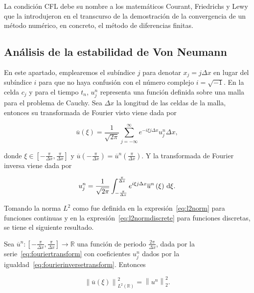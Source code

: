La condición CFL debe su nombre a los matemáticos Courant, Friedrichs
y Lewy que la introdujeron en el transcurso de la demostración de la
convergencia de un método numérico, en concreto, el método de
diferencias finitas.

\subsection{Análisis de la estabilidad de Von Neumann}

En este apartado, emplearemos el subíndice $j$ para denotar
$x_{j}=j\Delta x$ en lugar del subíndice $i$ para que no haya
confusión con el número complejo $i=\sqrt{-1}$.
En la celda $c_{j}$ y para el tiempo $t_{n}$, $u^{n}_{j}$ representa
una función definida sobre una malla para el problema de Cauchy.
Sea $\Delta x$ la longitud de las celdas de la malla,
entonces su transformada de Fourier visto viene dada por

\begin{equation}\label{eq:fouriertransform}
  \overline{u}
  \left(\xi\right)=
  \frac{1}{\sqrt{2\pi}}
  \sum_{j=-\infty}^{\infty}
  e^{-i\xi j\Delta x}
  u^{n}_{j}\Delta x,
\end{equation}

donde
\begin{math}
  \xi\in
  \left[
    -\frac{\pi}{\Delta x},
    \frac{\pi}{\Delta x}
    \right]
\end{math}
y
\begin{math}
  \overline{u}
  \left(
  -\frac{\pi}{\Delta x}
  \right)=
  \overline{u}^{n}
  \left(
  \frac{\pi}{\Delta x}
  \right)
\end{math}.
Y la transformada de Fourier inversa viene dada por

\begin{equation}\label{eq:fourierinversetransform}
  u^{n}_{j}=
  \frac{1}{\sqrt{2\pi}}
  \int_{-\frac{\pi}{\Delta x}}^{\frac{\pi}{\Delta x}}
  e^{i\xi j\Delta x}
  \overline{u}^{n}
  \left(\xi\right)
  \dl\xi.
\end{equation}

Tomando la norma $L^{2}$ como fue definida en la
expresión~\eqref{eq:l2norm} para funciones continuas y en la
expresión~\eqref{eq:l2normdiscrete} para funciones discretas, se
tiene el siguiente resultado.

\begin{theorem}
  Sea
  \begin{math}
    \overline{u}^{n}\colon
    \left[
      -\frac{\pi}{\Delta x},
      \frac{\pi}{\Delta x}
      \right]\to
    \mathbb{R}
  \end{math}
  una función de periodo $\frac{2\pi}{\Delta x}$, dada por la
  serie~\eqref{eq:fouriertransform} con coeficientes $u^{n}_{j}$
  dados por la igualdad~\eqref{eq:fourierinversetransform}.
  Entonces

  \begin{equation}\label{eq:parsevalidentity}
    {\left\|\overline{u}\left(\xi\right)\right\|}^{2}_{L^{2}\left(\mathbb{R}\right)}=
    {\left\|u^{n}\right\|}^{2}_{2}.
  \end{equation}
\end{theorem}

